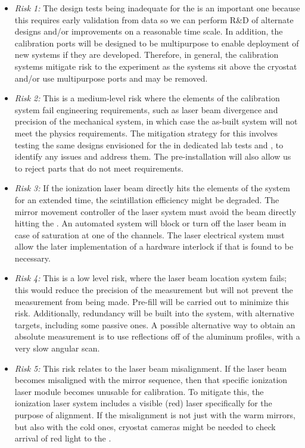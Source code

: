 \begin{itemize}
    \item \textit{Risk 1:} The  design tests being inadequate for the  is an important one because this requires early validation from  data so we can perform R\&D of alternate designs and/or improvements on a reasonable time scale. In addition, the calibration ports will be designed to be multipurpose to enable deployment of new systems if they are developed. Therefore, in general, the calibration systems mitigate risk to the experiment as the systems sit above the cryostat and/or use multipurpose ports and may be removed.
    \item \textit{Risk 2:} This is a medium-level risk where the elements of the calibration system fail engineering requirements, such as laser beam divergence and precision of the mechanical system, in which case the as-built system will not meet the physics requirements. The mitigation strategy for this involves testing the same designs envisioned for the  in dedicated lab tests and , to identify any issues and address them. The pre-installation  will also allow us to reject parts that do not meet requirements. 
    \item \textit{Risk 3:} If the ionization laser beam directly hits the elements of the  system for an extended time, the scintillation efficiency might be degraded. The mirror movement controller of the laser system must avoid the beam directly hitting the . An automated system will block or turn off the laser beam in case of saturation at one of the  channels. The laser electrical system must allow the later implementation of a hardware interlock if that is found to be necessary.
    \item \textit{Risk 4:} This is a low level risk, where the laser beam location system fails; this would reduce the precision of the \efield measurement but will not prevent the measurement from being made. Pre-fill  will be carried out to minimize this risk. Additionally, redundancy will be built into the system, with alternative targets, including some passive ones. A possible alternative way to obtain an absolute measurement is to use reflections off of the aluminum  profiles, with a very slow angular scan.
    \item \textit{Risk 5:} This risk relates to the laser beam misalignment. If the laser beam becomes misaligned with the mirror sequence, then that specific ionization laser module becomes unusable for calibration. To mitigate this, the ionization laser system includes a visible (red) laser specifically for the purpose of alignment. If the misalignment is not just with the warm mirrors, but also with the cold ones, cryostat cameras might be needed to check arrival of red light to the .

\end{itemize}
